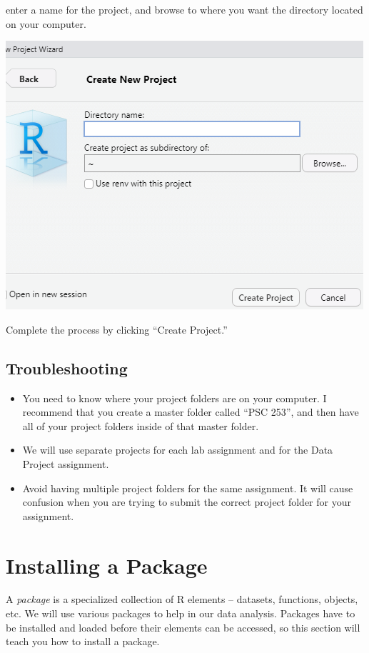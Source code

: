 \documentclass[
]{book}
\providecommand{\tightlist}{%
  \setlength{\itemsep}{0pt}\setlength{\parskip}{0pt}}
\begin{document}
enter a name for the project, and browse to where you want the directory located on your computer.

\includegraphics{images/projdirectory.png}

Complete the process by clicking ``Create Project.''

\hypertarget{troubleshooting-3}{%
\subsection{Troubleshooting}\label{troubleshooting-3}}

\begin{itemize}
\tightlist
\item
  You need to know where your project folders are on your computer. I recommend that you create a master folder called ``PSC 253'', and then have all of your project folders inside of that master folder.
\item
  We will use separate projects for each lab assignment and for the Data Project assignment.
\item
  Avoid having multiple project folders for the same assignment. It will cause confusion when you are trying to submit the correct project folder for your assignment.
\end{itemize}

\hypertarget{installpack}{%
\section{Installing a Package}\label{installpack}}

A \emph{package} is a specialized collection of R elements -- datasets, functions, objects, etc. We will use various packages to help in our data analysis. Packages have to be installed and loaded before their elements can be accessed, so this section will teach you how to install a package.
\end{document}
